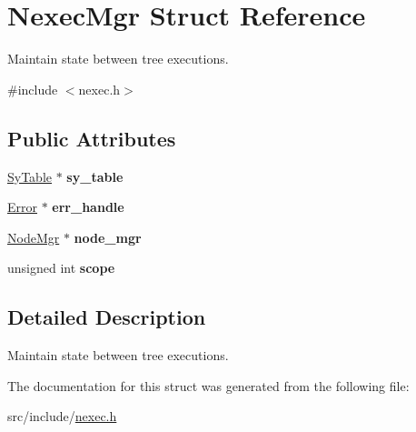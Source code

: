 \hypertarget{struct_nexec_mgr}{}\section{Nexec\+Mgr Struct Reference}
\label{struct_nexec_mgr}


Maintain state between tree executions.  




{\ttfamily \#include $<$nexec.\+h$>$}

\subsection*{Public Attributes}
\begin{DoxyCompactItemize}
\item 
\mbox{\label{struct_nexec_mgr_a52a46cb76bcb1c51fd330097817ba2b3}} 
\mbox{\hyperlink{struct_sy_table}{Sy\+Table}} $\ast$ {\bfseries sy\+\_\+table}
\item 
\mbox{\label{struct_nexec_mgr_ae7f212b8c54fc39b351e4cb7ba48f395}} 
\mbox{\hyperlink{struct_error}{Error}} $\ast$ {\bfseries err\+\_\+handle}
\item 
\mbox{\label{struct_nexec_mgr_a67bb5ce6c22f2f1e324a4823e77d548d}} 
\mbox{\hyperlink{struct_node_mgr}{Node\+Mgr}} $\ast$ {\bfseries node\+\_\+mgr}
\item 
\mbox{\label{struct_nexec_mgr_a46ad1ae7a7d7858d0888c81c6d19474b}} 
unsigned int {\bfseries scope}
\end{DoxyCompactItemize}


\subsection{Detailed Description}
Maintain state between tree executions. 

The documentation for this struct was generated from the following file\+:\begin{DoxyCompactItemize}
\item 
src/include/\mbox{\hyperlink{nexec_8h}{nexec.\+h}}\end{DoxyCompactItemize}
